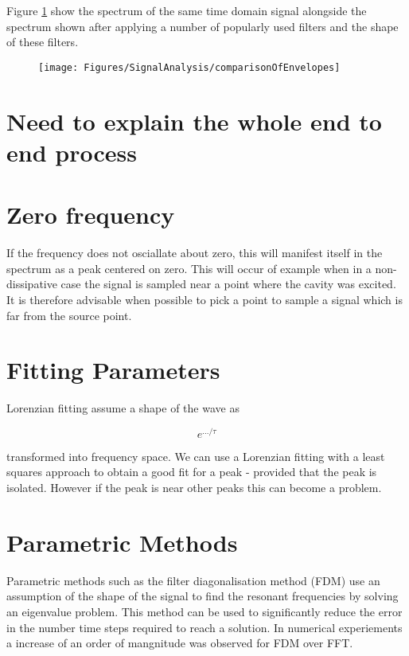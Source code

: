 Figure \ref{fig:signal-analysis-comparison-of-envelopes} show the spectrum of the same time domain signal alongside the spectrum shown after applying a number of popularly used filters and the shape of these filters.

\begin{figure}
\begin{center}
    \texttt{[image: Figures/SignalAnalysis/comparisonOfEnvelopes]}
\end{center}
\caption{}
\label{fig:signal-analysis-comparison-of-envelopes}
\end{figure}

\section{Need to explain the whole end to end process}

\section{Zero frequency}
If the frequency does not osciallate about zero, this will manifest itself in the spectrum as a peak centered on zero. This will occur of example when in a non-dissipative case the signal is sampled near a point where the cavity was excited. It is therefore advisable when possible to pick a point to sample a signal which is far from the source point.

\section{Fitting Parameters}

Lorenzian fitting assume a shape of the wave as

$$
e^{.../\tau}
$$

transformed into frequency space. We can use a Lorenzian fitting with a least squares approach to obtain a good fit for a peak - provided that the peak is isolated. However if the peak is near other peaks this can become a problem.


\section{Parametric Methods}

Parametric methods such as the filter diagonalisation method (FDM) use an assumption of the shape of the signal to find the resonant frequencies by solving an eigenvalue problem. This method can be used to significantly reduce the error in the number time steps required to reach a solution. In numerical experiements a increase of an order of mangnitude was observed for FDM over FFT.

